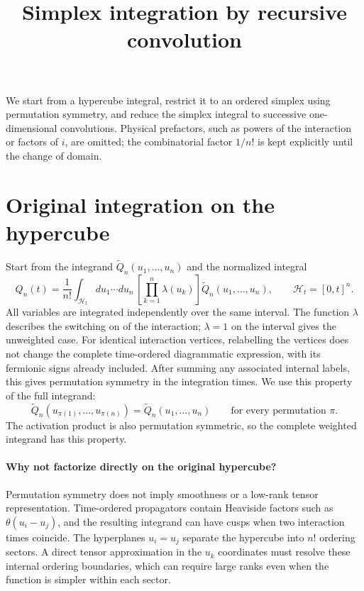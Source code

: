 \documentclass[11pt]{article}
\title{Simplex integration by recursive convolution}
\author{}
\date{}
\begin{document}
\maketitle
\vspace{-1.5em}

We start from a hypercube integral, restrict it to an ordered simplex
using permutation symmetry, and reduce the simplex integral to successive
one-dimensional convolutions. Physical prefactors, such as powers of the
interaction or factors of $i$, are omitted; the combinatorial factor
$1/{n!}$ is kept explicitly until the change of domain.

\section{Original integration on the hypercube}

Start from the integrand $\widetilde Q_n(u_1,\ldots,u_n)$ and the
normalized integral
\begin{equation}
    \boxed{Q_n(t)=\frac{1}{n!}
    \int_{\mathcal H_t}du_1\cdots du_n\,
    \left[\prod_{k=1}^n\lambda(u_k)\right]
    \widetilde Q_n(u_1,\ldots,u_n),
    \qquad \mathcal H_t={[0,t]}^n.}
    \label{eq:hypercube_integral}
\end{equation}
All variables are integrated independently over the same interval.
The function $\lambda$ describes the switching on of the interaction;
$\lambda=1$ on the interval gives the unweighted case.
For identical interaction vertices, relabelling the vertices does not
change the complete time-ordered diagrammatic expression, with its
fermionic signs already included. After summing any associated internal
labels, this gives permutation symmetry in the integration times.
We use this property of the full integrand:
\begin{equation}
    \widetilde Q_n(u_{\pi(1)},\ldots,u_{\pi(n)})
    =\widetilde Q_n(u_1,\ldots,u_n)
    \qquad\text{for every permutation }\pi.
    \label{eq:symmetry}
\end{equation}
The activation product is also permutation symmetric, so the complete
weighted integrand has this property.

\paragraph{Why not factorize directly on the original hypercube?}
Permutation symmetry does not imply smoothness or a low-rank tensor
representation. Time-ordered propagators contain Heaviside factors such
as $\theta(u_i-u_j)$, and the resulting integrand can have cusps when two
interaction times coincide. The hyperplanes $u_i=u_j$ separate the
hypercube into ${n!}$ ordering sectors. A direct tensor approximation in
the $u_k$ coordinates must resolve these internal ordering boundaries,
which can require large ranks even when the function is simpler within
each sector.
\end{document}

